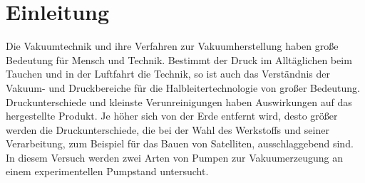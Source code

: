 \section{Einleitung}
Die Vakuumtechnik und ihre Verfahren zur Vakuumherstellung haben große Bedeutung für Mensch und Technik.
Bestimmt der Druck im Alltäglichen beim Tauchen und in der Luftfahrt die Technik, so ist auch das Verständnis der Vakuum- und Druckbereiche
für die Halbleitertechnologie von großer Bedeutung.
Druckunterschiede und kleinste Verunreinigungen haben Auswirkungen auf das hergestellte Produkt.
Je höher sich von der Erde entfernt wird, desto größer werden die Druckunterschiede, die bei der Wahl des Werkstoffs und seiner Verarbeitung,
zum Beispiel für das Bauen von Satelliten, ausschlaggebend sind.
In diesem Versuch werden zwei Arten von Pumpen zur Vakuumerzeugung an einem experimentellen Pumpstand untersucht.
